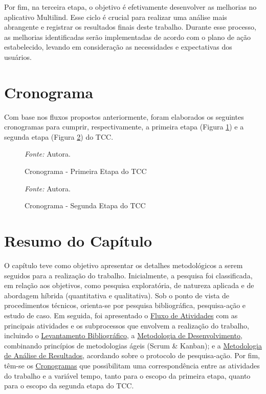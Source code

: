 Por fim, na terceira etapa, o objetivo é efetivamente desenvolver as melhorias no aplicativo Multilind. Esse ciclo é crucial para realizar uma análise mais abrangente e registrar os resultados finais deste trabalho. Durante esse processo, as melhorias identificadas serão implementadas de acordo com o plano de ação estabelecido, levando em consideração as necessidades e expectativas dos usuários.

\section{Cronograma}
\label{sec:Cronograma}
Com base nos fluxos propostos anteriormente, foram elaborados os seguintes cronogramas para cumprir, respectivamente, a primeira etapa (Figura \ref{fig06}) e a segunda etapa (Figura \ref{fig07}) do TCC.

\begin{figure}[h!]
	\centering
	\caption{Cronograma - Primeira Etapa do TCC}
	\begin{tablenotes}[flushleft]
		\centering
		\item \textit{Fonte:} Autora.
	\end{tablenotes}
	\label{fig06}
\end{figure}

\pagebreak

\begin{figure}[h!]
	\centering
	\caption{Cronograma - Segunda Etapa do TCC}
	\begin{tablenotes}[flushleft]
		\centering
		\item \textit{Fonte:} Autora.
	\end{tablenotes}
	\label{fig07}
\end{figure}

\section{Resumo do Capítulo}
\label{sec:Resumo do Capitulo}
O capítulo teve como objetivo apresentar os detalhes metodológicos a serem seguidos para a realização do trabalho. Inicialmente, a pesquisa foi classificada, em relação aos objetivos, como pesquisa exploratória, de natureza aplicada 
e de abordagem híbrida (quantitativa e qualitativa). Sob o ponto de vista de procedimentos técnicos, orienta-se por pesquisa bibliográfica, pesquisa-ação e estudo de caso. Em seguida, foi apresentado o \hyperref[sec:Fluxo de Atividades]{Fluxo de Atividades}
com as principais atividades e os subprocessos que envolvem a realização do trabalho, incluindo o \hyperref[sec:Levantamento Bibliografico]{Levantamento Bibliográfico}, a \hyperref[sec:Metodologia de Desenvolvimento]{Metodologia de Desenvolvimento}, combinando princípios de metodologias ágeis (Scrum \& Kanban); e a 
\hyperref[sec:Metodologia de Analise de Resultados]{Metodologia de Análise de Resultados}, acordando sobre o protocolo de pesquisa-ação. Por fim, têm-se os \hyperref[sec:Cronograma]{Cronogramas} que possibilitam uma correspondência entre as atividades do trabalho e a variável tempo, tanto para o escopo da primeira 
etapa, quanto para o escopo da segunda etapa do TCC.